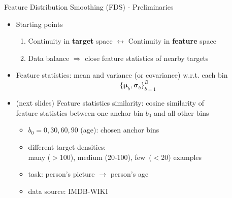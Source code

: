 
\begin{frame}{Feature Distribution Smoothing (FDS) - Preliminaries}
	\begin{itemize}\setlength\itemsep{1.5em}
		\item<1-> Starting points
		\begin{enumerate}
			\item Continuity in \textbf{target} space $\longleftrightarrow$ Continuity in \textbf{feature} space
			\item Data balance $\Longrightarrow$ close feature statistics of nearby targets
		\end{enumerate}
		\item<2-> Feature statistics: mean and variance (or covariance) w.r.t. each bin
		\begin{equation*}
			\{\bm{\mu}_b,\bm{\sigma}_b\}_{b=1}^B
		\end{equation*}
		\item<3-> (next slides) Feature statistics similarity: cosine similarity of \\feature statistics between one anchor bin $b_0$ and all other bins
		\begin{itemize}
			\item $b_0 = 0, 30, 60, 90$ (age): chosen anchor bins
			\item different target densities: \\many ($>$100), medium (20-100), few~($<$20) examples
			\item task: person's picture $\longrightarrow$ person's age
			\item data source: IMDB-WIKI
		\end{itemize}
	\end{itemize}
\end{frame}



